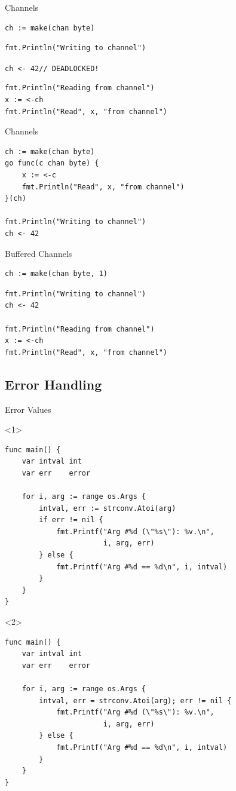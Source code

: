 \documentclass[pdf]{beamer}
\newcommand\z[1]{\texttt{#1}}
\begin{document}
\begin{frame}[fragile]{Channels}
\begin{lstlisting}
ch := make(chan byte)
\end{lstlisting}
\begin{lstlisting}
fmt.Println("Writing to channel")
\end{lstlisting}
{\color{red}\z{ch <- 42\qquad\qquad// DEADLOCKED!}}
\begin{lstlisting}
fmt.Println("Reading from channel")
x := <-ch
fmt.Println("Read", x, "from channel")
\end{lstlisting}
\end{frame}

\begin{frame}[fragile]{Channels}
\begin{lstlisting}
ch := make(chan byte)
go func(c chan byte) {
    x := <-c
    fmt.Println("Read", x, "from channel")
}(ch)

fmt.Println("Writing to channel")
ch <- 42
\end{lstlisting}
\end{frame}

\begin{frame}[fragile]{Buffered Channels}
\begin{lstlisting}
ch := make(chan byte, 1)
\end{lstlisting}
\pause
\begin{lstlisting}
fmt.Println("Writing to channel")
ch <- 42

fmt.Println("Reading from channel")
x := <-ch
fmt.Println("Read", x, "from channel")
\end{lstlisting}
\end{frame}

\subsection{Error Handling}
\begin{frame}[fragile]{Error Values}
\begin{onlyenv}<1>
\begin{lstlisting}
func main() {
    var intval int
    var err    error

    for i, arg := range os.Args {
        intval, err := strconv.Atoi(arg)
        if err != nil {
            fmt.Printf("Arg #%d (\"%s\"): %v.\n",
                       i, arg, err)
        } else {
            fmt.Printf("Arg #%d == %d\n", i, intval)
        }
    }
}
\end{lstlisting}
\end{onlyenv}
\begin{onlyenv}<2>
\begin{lstlisting}
func main() {
    var intval int
    var err    error

    for i, arg := range os.Args {
        intval, err = strconv.Atoi(arg); err != nil {
            fmt.Printf("Arg #%d (\"%s\"): %v.\n",
                       i, arg, err)
        } else {
            fmt.Printf("Arg #%d == %d\n", i, intval)
        }
    }
}
\end{lstlisting}
\end{onlyenv}
\end{frame}
\end{document}
